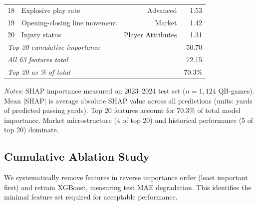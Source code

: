 \begin{table}[htbp]
\begin{tabular}{llrr}
    18 & Explosive play rate & Advanced & 1.53 \\
    19 & Opening-closing line movement & Market & 1.42 \\
    20 & Injury status & Player Attributes & 1.31 \\
    \midrule
    \multicolumn{3}{l}{\textit{Top 20 cumulative importance}} & 50.70 \\
    \multicolumn{3}{l}{\textit{All 63 features total}} & 72.15 \\
    \multicolumn{3}{l}{\textit{Top 20 as \% of total}} & 70.3\% \\
    \bottomrule
  \end{tabular}
  \vspace{0.5em}
  \begin{flushleft}
    \footnotesize\textit{Notes}: SHAP importance measured on 2023--2024 test set ($n=1{,}124$ QB-games). Mean |SHAP| is average absolute SHAP value across all predictions (units: yards of predicted passing yards). Top 20 features account for 70.3\% of total model importance. Market microstructure (4 of top 20) and historical performance (5 of top 20) dominate.
  \end{flushleft}
\end{table}

\subsection{Cumulative Ablation Study}

We systematically remove features in reverse importance order (least important first) and retrain XGBoost, measuring test MAE degradation. This identifies the minimal feature set required for acceptable performance.

